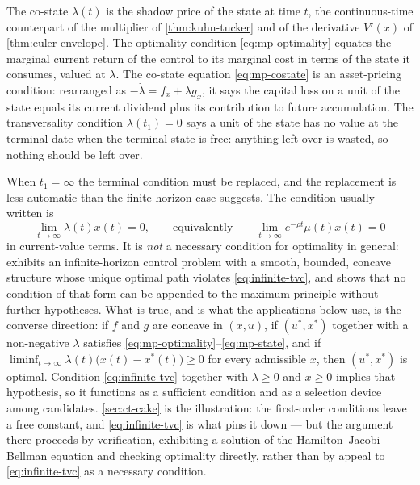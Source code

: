 \begin{remark}\label{rem:mp-reading}
	The co-state $\lambda(t)$ is the shadow price of the state at time $t$, the
	continuous-time counterpart of the multiplier of \autoref{thm:kuhn-tucker} and
	of the derivative $V'(x)$ of \autoref{thm:euler-envelope}. The optimality
	condition \eqref{eq:mp-optimality} equates the marginal current return of the
	control to its marginal cost in terms of the state it consumes, valued at
	$\lambda$. The co-state equation \eqref{eq:mp-costate} is an asset-pricing
	condition: rearranged as $-\dot\lambda=f_x+\lambda g_x$, it says the capital loss
	on a unit of the state equals its current dividend plus its contribution to
	future accumulation. The transversality condition $\lambda(t_1)=0$ says a unit
	of the state has no value at the terminal date when the terminal state is free:
	anything left over is wasted, so nothing should be left over.

	When $t_1=\infty$ the terminal condition must be replaced, and the replacement
	is less automatic than the finite-horizon case suggests. The condition usually
	written is
	\begin{equation}\label{eq:infinite-tvc}
		\lim_{t\to\infty}\lambda(t)x(t)=0,
		\qquad\text{equivalently}\qquad
		\lim_{t\to\infty}e^{-\rho t}\mu(t)x(t)=0
	\end{equation}
	in current-value terms. It is \emph{not} a necessary condition for optimality in
	general: \textcite{halkin1974necessary} exhibits an infinite-horizon control
	problem with a smooth, bounded, concave structure whose unique optimal path
	violates \eqref{eq:infinite-tvc}, and shows that no condition of that form can
	be appended to the maximum principle without further hypotheses. What is true,
	and is what the applications below use, is the converse direction: if $f$ and
	$g$ are concave in $(x,u)$, if $(u^{\ast},x^{\ast})$ together with a
	non-negative $\lambda$ satisfies \eqref{eq:mp-optimality}--\eqref{eq:mp-state},
	and if $\liminf_{t\to\infty}\lambda(t)\bigl(x(t)-x^{\ast}(t)\bigr)\geq0$ for
	every admissible $x$, then $(u^{\ast},x^{\ast})$ is optimal. Condition
	\eqref{eq:infinite-tvc} together with $\lambda\geq0$ and $x\geq0$ implies that
	hypothesis, so it functions as a sufficient condition and as a selection device
	among candidates. \autoref{sec:ct-cake} is the illustration: the first-order
	conditions leave a free constant, and \eqref{eq:infinite-tvc} is what pins it
	down --- but the argument there proceeds by verification, exhibiting a solution
	of the Hamilton--Jacobi--Bellman equation and checking optimality directly,
	rather than by appeal to \eqref{eq:infinite-tvc} as a necessary condition.
\end{remark}

